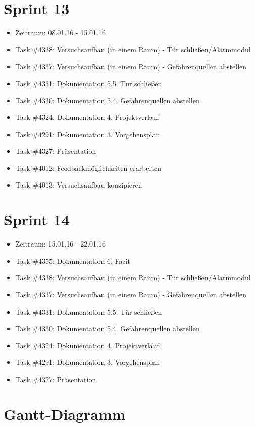 \documentclass[12pt, oneside, smallheadings]{scrbook}
\begin{document}
\section{Sprint 13}
\begin{itemize}
	\item Zeitraum: 08.01.16 - 15.01.16 \newline
	\item Task \#4338: Versuchsaufbau (in einem Raum) - Tür schließen/Alarmmodul
	\item Task \#4337: Versuchsaufbau (in einem Raum) - Gefahrenquellen abstellen
	\item Task \#4331: Dokumentation 5.5. Tür schließen
	\item Task \#4330: Dokumentation 5.4. Gefahrenquellen abstellen
	\item Task \#4324: Dokumentation 4. Projektverlauf
	\item Task \#4291: Dokumentation 3. Vorgehensplan
	\item Task \#4327: Präsentation
	\item Task \#4012: Feedbackmöglichkeiten erarbeiten
	\item Task \#4013: Versuchsaufbau konzipieren
\end{itemize}

\section{Sprint 14}
\begin{itemize}
	\item Zeitraum: 15.01.16 - 22.01.16 \newline
	\item Task \#4355: Dokumentation 6. Fazit
	\item Task \#4338: Versuchsaufbau (in einem Raum) - Tür schließen/Alarmmodul
	\item Task \#4337: Versuchsaufbau (in einem Raum) - Gefahrenquellen abstellen
	\item Task \#4331: Dokumentation 5.5. Tür schließen
	\item Task \#4330: Dokumentation 5.4. Gefahrenquellen abstellen
	\item Task \#4324: Dokumentation 4. Projektverlauf
	\item Task \#4291: Dokumentation 3. Vorgehensplan
	\item Task \#4327: Präsentation
\end{itemize}

\section{Gantt-Diagramm}
\end{document}
